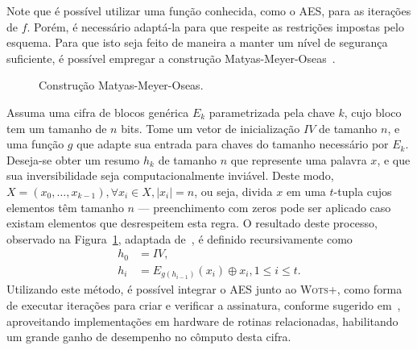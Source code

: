 \documentclass[12pt,notitlepage]{report}
\newcommand{\length}[1]{\vert #1 \vert}
\newcommand{\wotsplus}{\textsc{Wots+}}
\begin{document}
Note que é possível utilizar uma função conhecida, como o AES, para as
iterações de $f$. Porém, é necessário adaptá-la para que respeite as
restrições impostas pelo esquema. Para que isto seja feito de maneira
a manter um nível de segurança suficiente, é possível empregar a construção
Matyas-Meyer-Oseas~\cite[9.41]{Menezes:1996:HAC:548089}.

\begin{figure}[ht]
  \centering
  \caption{Construção Matyas-Meyer-Oseas.}
  \label{fig:6}
\end{figure}

Assuma uma cifra de blocos genérica $E_{k}$ parametrizada pela chave $k$, cujo
bloco tem um tamanho de $n$ bits. Tome um vetor de inicialização $IV$ de
tamanho $n$, e uma função $g$ que adapte sua entrada para chaves do tamanho
necessário por $E_{k}$. Deseja-se obter um resumo $h_k$ de tamanho $n$ que
represente uma palavra $x$, e que sua inversibilidade seja computacionalmente
inviável. Deste modo, $X = (x_0, \dots, x_{k - 1}), \forall x_i \in X,
\length{x_i} = n$, ou seja, divida $x$ em uma $t$-tupla cujos elementos têm
tamanho $n$ --- preenchimento com zeros pode ser aplicado caso existam
elementos que desrespeitem esta regra. O resultado deste processo, observado
na Figura~\ref{fig:6}, adaptada de~\cite{TikZ:for:Cryptographers}, é definido recursivamente como
\begin{equation}
    \begin{split}
        h_0 &= IV, \\
        h_i &= E_{g(h_{i-1})}(x_i) \oplus x_i, 1 \leq i \leq t.
    \end{split}
\end{equation}
Utilizando este método, é possível integrar o AES junto ao \wotsplus{}, como
forma de executar iterações para criar e verificar a assinatura, conforme
sugerido em~\cite[4.1]{Hlsing2013}, aproveitando implementações em
hardware de rotinas relacionadas,
habilitando um grande ganho de desempenho no cômputo desta cifra.
\end{document}
